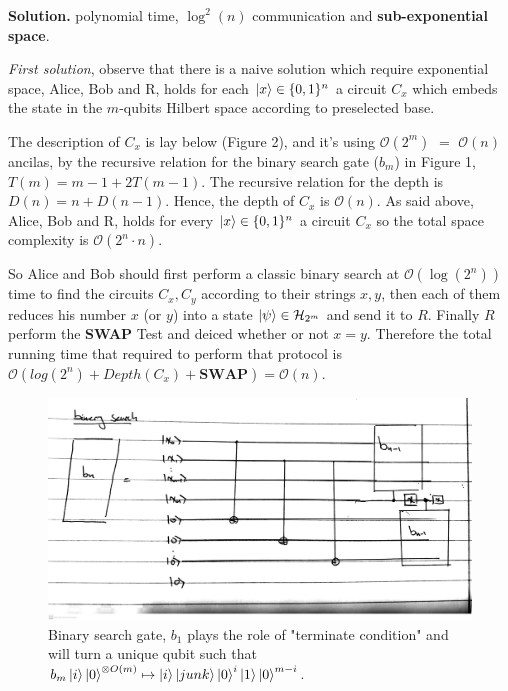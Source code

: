 \documentclass{article}
\newcommand{\onotation}[1]{\(\mathcal{O} \left( {#1}  \right) \)}
\newcommand{\ona}[1]{\onotation{#1}}
\begin{document}
\begin{enumerate}
\textbf{Solution.} polynomial time, \( \log^2(n) \) communication and \textbf{sub-exponential space}.  

\textit{First solution}, observe that there is a naive solution which require exponential space, Alice, Bob and R, holds for each \( \ket{x} \in \{0,1\}^n \) a circuit \( C_x \) which embeds the state in the \(m\)-qubits Hilbert space according to preselected base.

The description of \(C_x\) is lay below (Figure 2), and it's using \ona{ 2^{m} } \( = \) \ona{n} ancilas, by the recursive relation for the binary search gate (\(b_m\)) in Figure 1, \( T(m)= m-1 + 2T(m-1)\). The recursive relation for the depth is \( D(n)=n + D(n-1) \). Hence, the depth of \(C_x\) is \ona{n}. As said above, Alice, Bob and R, holds for every  \( \ket{x} \in \{0,1\}^n \) a circuit \(C_x\) so the total space complexity is \ona{2^n \cdot n}. 

So Alice and Bob should first perform a classic binary search at \ona{\log(2^n)} time to find the circuits \(C_x , C_y\) according to their strings \(x,y\), then each of them reduces his number \(x\) (or \( y \)) into a state \( \ket{\psi} \in \mathcal{H}_{2^m} \) and send it to \(R\). Finally \(R\) perform the \textbf{SWAP} Test and deiced whether or not \(x = y\). Therefore the total running time that required to perform that protocol is \(
    \mathcal{O}\left(log(2^n) + Depth(C_x) + \mathbf{SWAP}\right) = \mathcal{O}\left(n\right)      
\).
\begin{figure}[H]
\includegraphics[scale=0.13]{binarysearch}
\caption{Binary search gate, \(b_1\) plays the role of "terminate condition" and will turn a unique qubit such that \(b_m\ket{i}\ket{0}^{\otimes O(m)} \mapsto \ket{i}\ket{junk}\ket{0}^{i}\ket{1}\ket{0}^{m-i}\). }
    \label{fig:simulation_cases}
\end{figure}



\end{enumerate}
\end{document}
